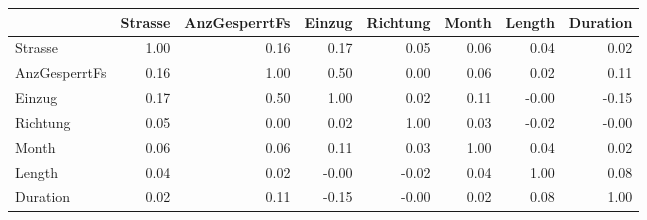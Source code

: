 \begin{tabular}{lrrrrrrr}
\toprule
{} &  Strasse &  AnzGesperrtFs &  Einzug &  Richtung &  Month &  Length &  Duration \\
\midrule
Strasse       &     1.00 &           0.16 &    0.17 &      0.05 &   0.06 &    0.04 &      0.02 \\
AnzGesperrtFs &     0.16 &           1.00 &    0.50 &      0.00 &   0.06 &    0.02 &      0.11 \\
Einzug        &     0.17 &           0.50 &    1.00 &      0.02 &   0.11 &   -0.00 &     -0.15 \\
Richtung      &     0.05 &           0.00 &    0.02 &      1.00 &   0.03 &   -0.02 &     -0.00 \\
Month         &     0.06 &           0.06 &    0.11 &      0.03 &   1.00 &    0.04 &      0.02 \\
Length        &     0.04 &           0.02 &   -0.00 &     -0.02 &   0.04 &    1.00 &      0.08 \\
Duration      &     0.02 &           0.11 &   -0.15 &     -0.00 &   0.02 &    0.08 &      1.00 \\
\bottomrule
\end{tabular}
